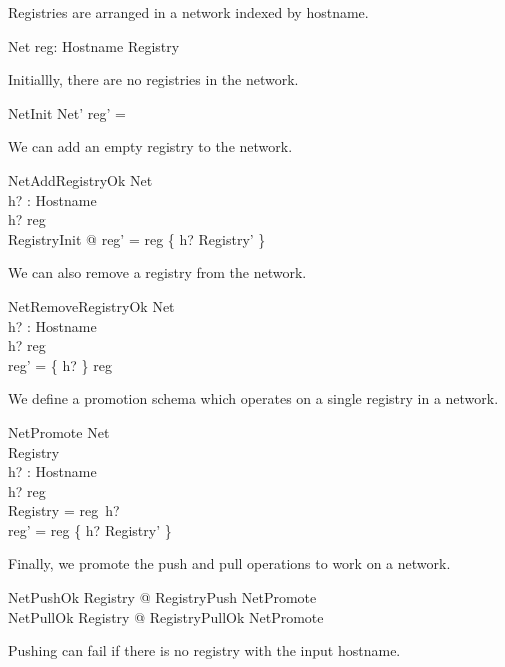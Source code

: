 \documentclass[a4paper,twoside,12pt]{article}
\begin{document}
Registries are arranged in a network indexed by hostname.
\begin{schema}{Net}
    reg: Hostname \pfun Registry \\
\end{schema}

Initiallly, there are no registries in the network.
\begin{schema}{NetInit}
  Net'
\where
  reg' = \emptyset
\end{schema}

We can add an empty registry to the network.
\begin{schema}{NetAddRegistryOk}
  \Delta Net \\
  h? : Hostname \\
\where
  h? \notin \dom reg \\
  \exists RegistryInit @ reg' = reg \cup \{ h? \mapsto \theta Registry' \} \\
\end{schema}

We can also remove a registry from the network.
\begin{schema}{NetRemoveRegistryOk}
  \Delta Net \\
  h? : Hostname \\
\where
  h? \in \dom reg \\
  reg' = \{ h? \} \ndres reg \\
\end{schema}

We define a promotion schema which operates on a single registry in a network.
\begin{schema}{NetPromote}
  \Delta Net \\
  \Delta Registry \\
  h? : Hostname \\
\where
  h? \in \dom reg \\
  \theta Registry = reg~h? \\
  reg' = reg \oplus \{ h? \mapsto \theta Registry' \} \\
\end{schema}

Finally, we promote the push and pull operations to work on a network.
\begin{zed}
  NetPushOk  \exists \Delta Registry @ RegistryPush \land NetPromote \\
  NetPullOk  \exists \Delta Registry @ RegistryPullOk \land NetPromote
\end{zed}
Pushing can fail if there is no registry with the input hostname.
\end{document}
